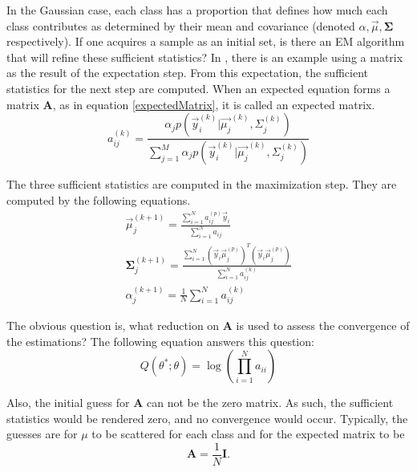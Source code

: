 \documentclass[]{article}
\begin{document}
In the Gaussian case, each class has a proportion that defines how much each class contributes as determined by their mean and covariance (denoted $\alpha, \vec{\mu}, \mathbf{\Sigma}$ respectively).   If one acquires a sample as an initial set, %
 is there an EM algorithm that will refine these sufficient statistics?   %
In \cite{yamazaki98introduction}, there is an example using a matrix as the result of the expectation step.  From this expectation, the sufficient statistics for the next step are %
 computed.   When an expected equation forms a matrix $\mathbf{A}$, as in equation %
\ref{expectedMatrix}, it is called an expected matrix.
\begin{equation}
a_{ij}^{(k)}     = \frac {\alpha_j p(\vec{y}_i  ^{(k)}  | \vec{\mu_j} ^{(k)} , \Sigma_j ^{(k)}  )}{\sum_{j=1}^M \alpha_j p(\vec{y}_i  ^{(k)}  | \vec{\mu_j} ^{(k)} , \Sigma_j ^{(k)}  )} \label{expectedMatrix}
\end{equation}


The three sufficient statistics are computed in the maximization step.   They are computed by the following equations.
\begin{eqnarray}
\vec{\mu} _j ^{(k+1)} = \frac{\sum_{i=1} ^N a_{ij}^{(p)} \vec{y}_i} {\sum_{i=1}^N a_{ij} } \\
\mathbf{\Sigma} _j ^{(k+1)} = \frac {\sum_{i=1}^N (\vec{y}_i \vec{\mu}_j ^{(p)} )^T(\vec{y}_i \vec{\mu}_j ^{(p)} ) } {\sum_{i=1}^N a^{(k)}_{ij}}  \\
\alpha _j ^ {(k+1)} = \frac{1}{N} \sum_{i=1}^N a^{(k)}_{ij}
\end{eqnarray}



The obvious question is, what reduction on $\mathbf{A}$ is used to assess the convergence of the estimations?  %
The following equation answers this question:
\begin{equation}
Q ( \theta ^* ; \theta ) =\log (\prod_{i=1} ^N  a_{ii} )
\end{equation}


Also, the initial guess for $\mathbf{A}$ can not be the zero matrix.  As such, the sufficient statistics would be rendered zero, and no convergence would occur.   Typically, the guesses are for $\mu$ to be scattered for each class and for the expected matrix to be 
\[ 
\mathbf{A} = \frac{1}{N} \mathbf{I}.
\]
\end{document}
